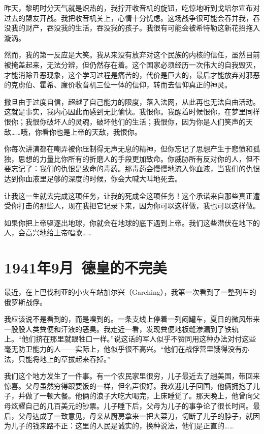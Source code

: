 \documentclass[UTF8]{ctexart}
\begin{document}
昨天，黎明时分天气就是炽热的，我拧开收音机的旋钮，吃惊地听到戈培尔宣布对过去的盟友开战。我把收音机关上，心情十分忧虑。这场战争很可能会吞并我，吞没我的财产，吞没我的生活，吞没我的孩子。我很有可能会被希特勒这新花招拖入漩涡。

然而，我的第一反应是大笑。我从来没有放弃对这个民族的内核的信任，虽然目前被掩盖起来，无法分辨，但仍然存在着。这个国家必须经历一次伟大的自我毁灭，才能消除丑恶现象，这个学习过程是痛苦的，代价是巨大的，最后才能放弃对邪恶的克虏伯、霍希、廉价收音机三位一体的信仰，转而去信仰真正的神灵。

撒旦由于过度自信，超越了自己能力的限度，落入法网，从此再也无法自由活动。这就是事实，我内心因此而感到无比愉快。我恨你。我醒着时候恨你，在梦里同样恨你；我恨你破坏人的灵魂，破坏他们的生活；我恨你，因为你是人们笑声的天敌……哦，你看你也是上帝的天敌，我恨你。

你每次讲演都在嘲弄被你压制得无声无息的精神，但你忘记了思想产生于悲愤和孤独，思想的力量比你所有的折磨人的手段更加致命。你威胁所有反对你的人，但不要忘记了：我们的仇恨是致命的毒药。那毒药会慢慢地流入你血液，当我们的仇恨达到你血液里足够的深度的时候，你会大喊大叫地死去。

让我这一生就去完成这项任务，让我的死成全这项任务！这个承诺来自那些真正遭受你打击的那些人，现在我把它记录下来，因为你可以这样做，我也可以这样做。

如果你把上帝驱逐出地球，你就会在地球的底下遇到上帝。我们这些潜伏在地下的人，会高兴地给上帝唱歌……

\section{1941年9月\ 德皇的不完美}

最近，在上巴伐利亚的小火车站加尔兴（Garching），我第一次看到了一整列车的俄罗斯战俘。

我应该说不是看到的，而是嗅到的。一条支线上停着一列闷罐车，夏日的微风带来一股股人类粪便和汗液的恶臭。我走近一看，发现粪便地板缝渗漏到了铁轨上。“他们挤在那里就跟牲口一样。”说这话的军人似乎不赞同用这种办法对付这些毫无防卫能力的人——实际上，他似乎很不高兴。“他们在战俘营里饿得没有办法，只能将地上的草拔起来吞掉。”

我们这个地方发生了一件事。有一个农民家里很穷，儿子最近去了趟美国，带回来惊喜。父母虽然穷得跟要饭的一样，但名声很好。我欢迎儿子回国，他俩拥抱了儿子，并做了一顿大餐。他俩的浪子大吃大喝完，上床睡觉了。那天晚上，他曾向父母炫耀自己的几百美元的钞票。儿子睡下后，父母为儿子的事争论了很长时间。最后，父母达成了一致意见，母亲从厨房拿来一把大菜刀，切断了儿子的脖子，就因为儿子的钱来路不正：这里的人民是诚实的，换种说法，他们是正直的……
\end{document}
